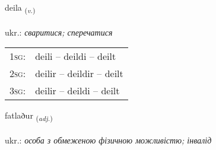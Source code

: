 \documentclass[frontgrid, backgrid]{flacards}\usepackage[]{graphicx}\usepackage[]{xcolor}
\begin{document}
\renewcommand{\blhead}{\vskip5pt {\small\bfseries\footnotesize Sagnorð | дієслово }}
\renewcommand{\bcfoot}{\vskip5pt \hspace{2pt}{\small\bfseries\footnotesize 2K}}


{deila \small{\textsubscript{(\textit{v.})}} \\[1ex] %
\textphonetic{[teiːla]} \\
ukr.: \emph{сваритися; сперечатися} \\  [2ex]
\renewcommand*{\arraystretch}{0.8}
\begin{tabular}{p{1cm}l}
\textsc{1sg}: & deili -- deildi -- deilt \\ 
\textsc{2sg}: & deilir -- deildir -- deilt \\ 
\textsc{3sg}: & deilir -- deildi -- deilt \\ 
\end{tabular}
}

\renewcommand{\flhead}{\vskip5pt \fboxsep=0pt {\small\bfseries\footnotesize Lýsingarorð | прикметник}}
\renewcommand{\fcfoot}{\vskip5pt \fboxsep=0pt \hspace{2pt}{\small\bfseries\footnotesize 2K}}

\renewcommand{\blhead}{\vskip5pt {\small\bfseries\footnotesize Lýsingarorð | прикметник }}
\renewcommand{\bcfoot}{\vskip5pt \hspace{2pt}{\small\bfseries\footnotesize 2K}}


{fatlaður \small{\textsubscript{(\textit{adj.})}} \\[1ex] %
\textphonetic{[fahtlaðʏr]} \\
ukr.: \emph{особа з обмеженою фізичною можливістю; інвалід} \\  [2ex]
\renewcommand*{\arraystretch}{0.8}
}
\end{document}

